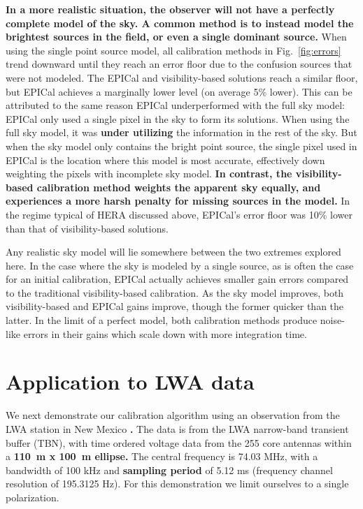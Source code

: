 \documentclass[a4paper,fleqn,usenatbib]{../mnras}
\begin{document}
\textbf{In a more realistic situation, the observer will not have a perfectly complete model of the sky.
A common method is to instead model the brightest sources in the field,
or even a single dominant source.}
When using the single point source model, all calibration methods in Fig.~\ref{fig:errors} trend 
downward until they reach an error floor due to the confusion sources that were not modeled. 
The EPICal and visibility-based solutions reach a similar floor, but EPICal achieves a 
marginally lower level (on average 5\% lower). This can be attributed to the same reason 
EPICal underperformed with the full sky model: EPICal only used a single pixel in the sky to 
form its solutions. When using the full sky model, it was \textbf{under utilizing} the information in the 
rest of the sky. But when the sky model only contains the bright point source, the single pixel 
used in EPICal is the location where this model is most accurate, effectively down weighting 
the pixels with incomplete sky model. 
\textbf{In contrast, the visibility-based calibration method weights the apparent sky equally,
and experiences a more harsh penalty for missing sources in the model.}
In the regime typical of HERA discussed above, EPICal's 
error floor was 10\% lower than that of visibility-based solutions.

Any realistic sky model will lie somewhere between the two extremes explored here. In the 
case where the sky is modeled by a single source, as is often the case for an initial calibration, 
EPICal actually achieves smaller gain errors compared to the traditional visibility-based 
calibration. As the sky model improves, both visibility-based and EPICal gains improve, though 
the former quicker than the latter. In the limit of a perfect model, both calibration methods 
produce noise-like errors in their gains which scale down with more integration time.

\section{Application to LWA data}\label{sec:data}
We next demonstrate our calibration algorithm using an observation from the LWA station in 
New Mexico \textbf{\citep{ell13}.} The data is from the LWA narrow-band transient buffer (TBN), with time ordered 
voltage data from the 255 core antennas within a \textbf{110~m x 100~m ellipse. }
The central frequency is 74.03 
MHz, with a bandwidth of 100 kHz and \textbf{sampling period} of 5.12 ms (frequency channel 
resolution of 195.3125 Hz). For this demonstration we limit ourselves to a single polarization.
\end{document}
